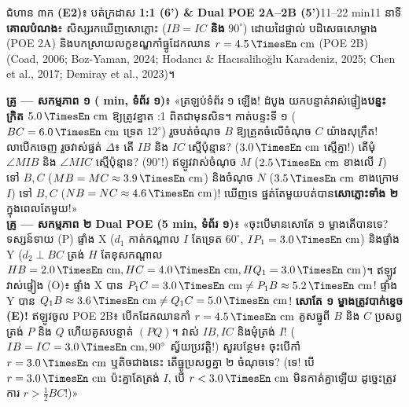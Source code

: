 \documentclass[a4paper,12pt]{article}
\newcommand{\en}[1]{{\TimesEn #1}}
\newcommand{\enbf}[1]{{\TimesEn\textbf{#1}}}
\newcommand{\unit}[1]{\,\text{\en{#1}}}
\newcommand{\ang}[1]{\ensuremath{\angle #1}}
\begin{document}
\Needspace{2.0cm}
\begin{phasebox}{ជំហាន ៣ក \enbf{(E2)}៖ បត់ក្រដាស \enbf{1:1 (6') \& Dual POE 2A--2B (5')}}{11--22 min}{11 នាទី}
\textbf{គោលបំណង}៖ សិស្សរកឃើញសោភ្លោះ ($IB=IC$ \textbf{និង} $90^\circ$) ដោយដៃផ្ទាល់ បដិសេធសោម្ខាង (\en{POE 2A}) និងបកស្រាយលក្ខខណ្ឌកាំធ្នូដែកឈាន $r=4.5\unit{cm}$ (\en{POE 2B}) \en{(Coad, 2006; Boz-Yaman, 2024; Hodancı \& Hacısalihoğlu Karadeniz, 2025; Chen et al., 2017; Demiray et al., 2023)}។
\end{phasebox}
\begin{scriptbox}
  \textbf{គ្រូ — សកម្មភាព ១ (\en{6 min}, ទំព័រ ១)}៖ «ត្រឡប់ទំព័រ ១ ឡើង! ដំបូង យកបន្ទាត់វាស់ផ្ទៀង\textbf{បន្ទះក្រិត $5.0\unit{cm}$} ឱ្យត្រូវខ្នាត \en{1:1} ពិតជាមុនសិន។ កាត់បន្ទះទី ១ ($BC = 6.0\unit{cm}$ ទ្រេត $12^\circ$) រួចបត់ចំណុច $B$ ឱ្យត្រួតចំលើចំណុច $C$ យ៉ាងសុក្រឹត! លាបើកចេញ រួចវាស់ផ្នត់ $\Delta$៖ តើ $IB$ និង $IC$ ស្មើប៉ុន្មាន? ($3.0\unit{cm}$ ស្មើគ្នា!) តើមុំ $\ang{MIB}$ និង $\ang{MIC}$ ស្មើប៉ុន្មាន? ($90^\circ$!) ឥឡូវវាស់ចំណុច $M$ ($2.5\unit{cm}$ ខាងលើ $I$) ទៅ $B, C$ ($MB = MC \approx 3.9\unit{cm}$) និងចំណុច $N$ ($3.5\unit{cm}$ ខាងក្រោម $I$) ទៅ $B, C$ ($NB = NC \approx 4.6\unit{cm}$)! ឃើញទេ ផ្នត់តែមួយបត់បាន\textbf{សោភ្លោះទាំង ២} ក្នុងពេលតែមួយ!»\\[2pt]
  \textbf{គ្រូ — សកម្មភាព ២ \en{Dual POE (5 min}, ទំព័រ ១)}៖ «ចុះបើមានសោតែ ១ ម្ខាងតើបានទេ? ទស្សន៍ទាយ (\en{P}) ផ្ទាំង \en{X} ($d_1$ កាត់កណ្ដាល $I$ តែទ្រេត $60^\circ$, $IP_1 = 3.0\unit{cm}$) និងផ្ទាំង \en{Y} ($d_2\perp BC$ ត្រង់ $H$ តែខុសកណ្ដាល $HB=2.0\unit{cm}, HC=4.0\unit{cm}, HQ_1=3.0\unit{cm}$)។ ឥឡូវវាស់ផ្ទៀង (\en{O})៖ ផ្ទាំង \en{X} បាន $P_1C = 3.0\unit{cm} \neq P_1B \approx 5.2\unit{cm}$! ផ្ទាំង \en{Y} បាន $Q_1B \approx 3.6\unit{cm} \neq Q_1C = 5.0\unit{cm}$! \textbf{សោតែ ១ ម្ខាងត្រូវបាក់ខ្ទេច (\en{E})!} ឥឡូវចូល \en{POE 2B}៖ បើកដែកឈានកាំ $r = 4.5\unit{cm}$ គូសធ្នូពី $B$ និង $C$ ប្រសព្វត្រង់ $P$ និង $Q$ ហើយគូសបន្ទាត់ $(PQ)$។ វាស់ $IB, IC$ និងមុំត្រង់ $I$! ($IB=IC=3.0\unit{cm}, 90^\circ$ ស្វ័យប្រវត្តិ!) សួរបន្ថែម៖ ចុះបើកាំ $r = 3.0\unit{cm}$ ឬតិចជាងនេះ តើធ្នូប្រសព្វគ្នា ២ ចំណុចទេ? (ទេ! បើ $r=3.0\unit{cm}$ ប៉ះគ្នាតែត្រង់ $I$, បើ $r<3.0\unit{cm}$ មិនកាត់គ្នាឡើយ ដូច្នេះត្រូវការ $r > \frac{1}{2}BC$!)»
\end{scriptbox}
\end{document}
